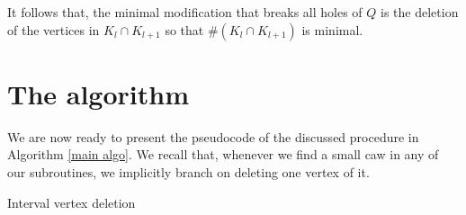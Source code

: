 \documentclass{article}
\theoremstyle{definition}
\begin{document}
    It follows that,
    the minimal modification
    that breaks all holes of $Q$ 
    is the deletion of the
    vertices in $K_{l} \cap K_{l+1}$ 
    so that $\# \left(K_{l} \cap K_{l+1}\right)$
    is minimal.

    \section{The algorithm}

    We are now ready to
    present the pseudocode
    of the discussed procedure in
    Algorithm \ref{main algo}.
    We recall that, whenever
    we find a small caw in
    any of our subroutines,
    we implicitly branch
    on deleting one vertex of it.

    \begin{algorithm}
        \caption{Interval vertex deletion}\label{main algo}



  
        \vspace{5pt}

\end{algorithm}
\end{document}
